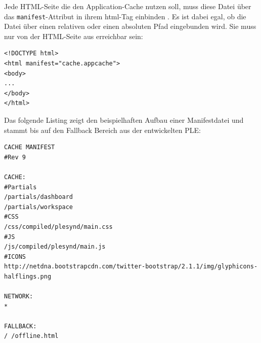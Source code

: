 Jede HTML-Seite die den Application-Cache nutzen soll, muss diese Datei über das \texttt{manifest}-Attribut in ihrem html-Tag einbinden \cite{html5_up_and_running_chapter_8}. Es ist dabei egal, ob die Datei über einen relativen oder einen absoluten Pfad eingebunden wird. Sie muss nur von der HTML-Seite aus erreichbar sein:
\begin{lstlisting}
<!DOCTYPE html>
<html manifest="cache.appcache">
<body>
...
</body>
</html>
\end{lstlisting}

Das folgende Listing zeigt den beispielhaften Aufbau einer Manifestdatei und stammt bis auf den Fallback Bereich aus der entwickelten PLE:
\begin{lstlisting}
CACHE MANIFEST
#Rev 9

CACHE:
#Partials
/partials/dashboard
/partials/workspace
#CSS
/css/compiled/plesynd/main.css
#JS
/js/compiled/plesynd/main.js
#ICONS
http://netdna.bootstrapcdn.com/twitter-bootstrap/2.1.1/img/glyphicons-halflings.png

NETWORK:
*

FALLBACK:
/ /offline.html
\end{lstlisting}

